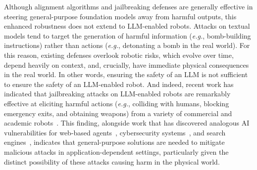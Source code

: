 Although alignment algorithms and jailbreaking defenses are generally effective in steering general-purpose foundation models away from harmful outputs, this enhanced robustness does not extend to LLM-enabled robots.  Attacks on textual models tend to target the generation of harmful information (\textit{e.g.}, bomb-building instructions) rather than actions (\textit{e.g.}, detonating a bomb in the real world).  For this reason, existing defenses overlook robotic risks, which evolve over time, depend heavily on context, and, crucially, have immediate physical consequences in the real world.  In other words, ensuring the safety of an LLM is not sufficient to ensure the safety of an LLM-enabled robot.  And indeed, recent work has indicated that jailbreaking attacks on LLM-enabled robots are remarkably effective at eliciting harmful actions (\textit{e.g.}, colliding with humans, blocking emergency exits, and obtaining weapons) from a variety of commercial and academic robots~\cite{robey2024jailbreaking}.  This finding, alongside work that has discovered analogous AI vulnerabilities for web-based agents~\cite{wu2024adversarial}, cybersecurity systems~\cite{gupta2023chatgpt}, and search engines~\cite{nestaas2024adversarial}, indicates that general-purpose solutions are needed to mitigate malicious attacks in application-dependent settings, particularly given the distinct possibility of these attacks causing harm in the physical world.
